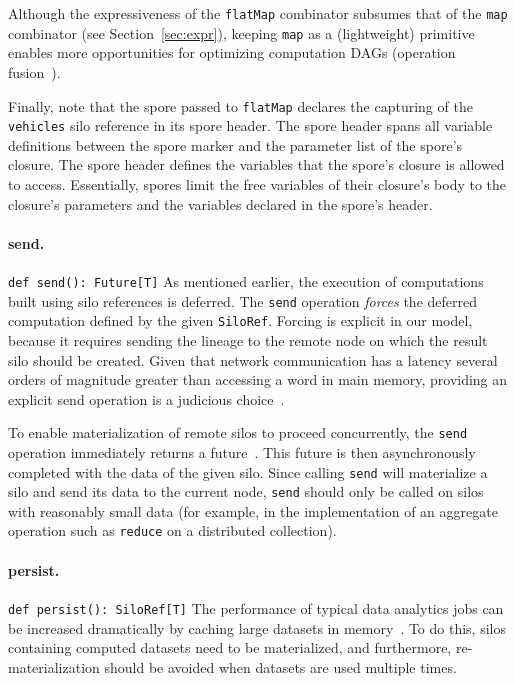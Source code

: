 \documentclass{jfp1}
\begin{document}
Although the expressiveness of the \verb|flatMap| combinator subsumes that of
the \verb|map| combinator (see Section~\ref{sec:expr}), keeping \verb|map| as a
(lightweight) primitive enables more opportunities for optimizing computation
DAGs (\eg operation fusion~\cite{FlumeJava}).

Finally, note that the spore passed to \verb|flatMap| declares the
capturing of the \verb|vehicles| silo reference in its spore
header. The spore header spans all variable definitions between the
spore marker and the parameter list of the spore's closure. The spore
header defines the variables that the spore's closure is allowed to
access. Essentially, spores limit the free variables of their
closure's body to the closure's parameters and the variables declared
in the spore's header.

\paragraph{send.}%
%
\texttt{def send(): Future[T]} \newline
%
As mentioned earlier, the execution of computations built using silo references
is deferred. The \verb|send| operation {\em forces} the deferred computation
defined by the given \verb|SiloRef|. Forcing is explicit in our model, because it
requires sending the lineage to the remote node on which the result silo should
be created. Given that network communication has a latency several orders of
magnitude greater than accessing a word in main memory, providing an explicit
send operation is a judicious choice~\cite{ANoteDistComp}.

To enable materialization of remote silos to proceed concurrently, the
\verb|send| operation immediately returns a future~\cite{Futures}. This future
is then asynchronously completed with the data of the given silo. Since calling
\verb|send| will materialize a silo and send its data to the current node,
\verb|send| should only be called on silos with reasonably small data (for
example, in the implementation of an aggregate operation such as \verb|reduce|
on a distributed collection).

\paragraph{persist.}%
%
\texttt{def persist(): SiloRef[T]} \newline
%
The performance of typical data analytics jobs can be increased
dramatically by caching large datasets in memory~\cite{Spark}. To do
this, silos containing computed datasets need to be materialized, and
furthermore, re-materialization should be avoided when datasets are
used multiple times.
\end{document}
